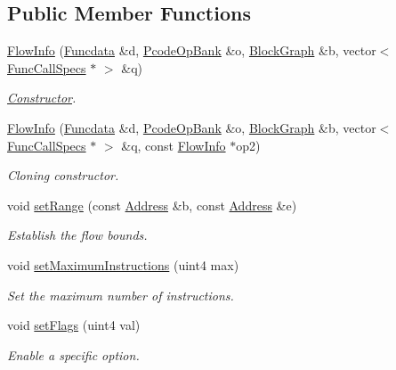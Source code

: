 \subsection*{Public Member Functions}
\begin{DoxyCompactItemize}
\item 
\mbox{\hyperlink{class_flow_info_a9c45181b9741e1a35af5b76ffdc3fe5e}{Flow\+Info}} (\mbox{\hyperlink{class_funcdata}{Funcdata}} \&d, \mbox{\hyperlink{class_pcode_op_bank}{Pcode\+Op\+Bank}} \&o, \mbox{\hyperlink{class_block_graph}{Block\+Graph}} \&b, vector$<$ \mbox{\hyperlink{class_func_call_specs}{Func\+Call\+Specs}} $\ast$ $>$ \&q)
\begin{DoxyCompactList}\small\item\em \mbox{\hyperlink{class_constructor}{Constructor}}. \end{DoxyCompactList}\item 
\mbox{\hyperlink{class_flow_info_a5d3d5378e522e75cedb21a80964dd2ad}{Flow\+Info}} (\mbox{\hyperlink{class_funcdata}{Funcdata}} \&d, \mbox{\hyperlink{class_pcode_op_bank}{Pcode\+Op\+Bank}} \&o, \mbox{\hyperlink{class_block_graph}{Block\+Graph}} \&b, vector$<$ \mbox{\hyperlink{class_func_call_specs}{Func\+Call\+Specs}} $\ast$ $>$ \&q, const \mbox{\hyperlink{class_flow_info}{Flow\+Info}} $\ast$op2)
\begin{DoxyCompactList}\small\item\em Cloning constructor. \end{DoxyCompactList}\item 
void \mbox{\hyperlink{class_flow_info_a4d268b911548180e9b86f4551d306477}{set\+Range}} (const \mbox{\hyperlink{class_address}{Address}} \&b, const \mbox{\hyperlink{class_address}{Address}} \&e)
\begin{DoxyCompactList}\small\item\em Establish the flow bounds. \end{DoxyCompactList}\item 
void \mbox{\hyperlink{class_flow_info_a2c8d88b187068f322a2bd8717c0e0ead}{set\+Maximum\+Instructions}} (uint4 max)
\begin{DoxyCompactList}\small\item\em Set the maximum number of instructions. \end{DoxyCompactList}\item 
void \mbox{\hyperlink{class_flow_info_a6cc4d42953d1d3106e1cf1938c97f977}{set\+Flags}} (uint4 val)
\begin{DoxyCompactList}\small\item\em Enable a specific option. \end{DoxyCompactList}\item 

\end{DoxyCompactItemize}
